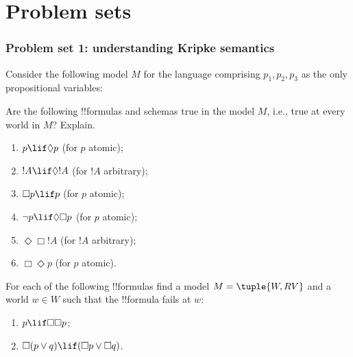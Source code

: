 \documentclass[../../../include/open-logic-section]{subfiles}
\begin{document}
\part{Problem sets}

\section{Problem set 1: understanding Kripke semantics}


\begin{problem} [60 points]
  Consider the following model ${M}$ for the language
  comprising $p_1, p_2, p_3$ as the only propositional variables:
\begin{center}
\end{center}
Are the following !!{formula}s and schemas true in the model ${M}$,
i.e., true at every world in ${M}$? Explain.
\begin{enumerate}
\item $p\lif \Diamond p$ (for $p$ atomic);
\item $!A\lif \Diamond !A$ (for $!A$ arbitrary);
\item $\Box p \lif p$ (for $p$ atomic);
\item $\lnot p \lif \Diamond \Box p$ (for $p$ atomic);
\item $\Diamond \Box !A$ (for $!A$ arbitrary);
\item $\Box \Diamond p$ (for $p$ atomic). 
\end{enumerate}
\end{problem}


\begin{problem} [20 points]
For each of the following !!{formula}s find a model ${M} = \tuple{W, R V}$ and a
world $w \in W$ such that the !!{formula} fails at $w$:
\begin{enumerate}
\item $p \lif \Box\Box p$;
\item $\Box(p \lor q) \lif (\Box p \lor \Box q)$.
\end{enumerate}
\end{problem}
\end{document}
